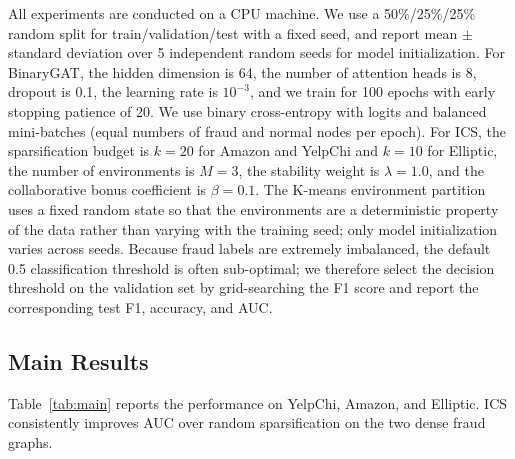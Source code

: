 \documentclass[11pt]{article}
\begin{document}
All experiments are conducted on a CPU machine. We use a 50\%/25\%/25\% random split for train/validation/test with a fixed seed, and report mean $\pm$ standard deviation over 5 independent random seeds for model initialization. For BinaryGAT, the hidden dimension is 64, the number of attention heads is 8, dropout is 0.1, the learning rate is $10^{-3}$, and we train for 100 epochs with early stopping patience of 20. We use binary cross-entropy with logits and balanced mini-batches (equal numbers of fraud and normal nodes per epoch). For ICS, the sparsification budget is $k=20$ for Amazon and YelpChi and $k=10$ for Elliptic, the number of environments is $M=3$, the stability weight is $\lambda=1.0$, and the collaborative bonus coefficient is $\beta=0.1$. The K-means environment partition uses a fixed random state so that the environments are a deterministic property of the data rather than varying with the training seed; only model initialization varies across seeds. Because fraud labels are extremely imbalanced, the default 0.5 classification threshold is often sub-optimal; we therefore select the decision threshold on the validation set by grid-searching the F1 score and report the corresponding test F1, accuracy, and AUC.

\subsection{Main Results}

Table~\ref{tab:main} reports the performance on YelpChi, Amazon, and Elliptic. ICS consistently improves AUC over random sparsification on the two dense fraud graphs.
\end{document}
